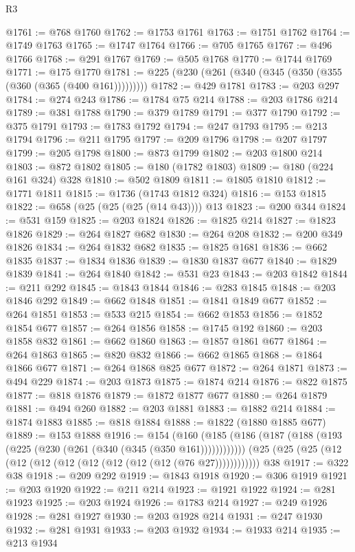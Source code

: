 \begin{lexlean}{R3}
\begin{coremodule}
@1761 := @768 @1760
@1762 := @1753 @1761
@1763 := @1751 @1762
@1764 := @1749 @1763
@1765 := @1747 @1764
@1766 := @705 @1765
@1767 := @496 @1766
@1768 := @291 @1767
@1769 := @505 @1768
@1770 := @1744 @1769
@1771 := @175 @1770
@1781 := @225 (@230 (@261 (@340 (@345 (@350 (@355 (@360 (@365 (@400 @161)))))))))
@1782 := @429 @1781
@1783 := @203 @297
@1784 := @274 @243
@1786 := @1784 @75 @214
@1788 := @203 @1786 @214
@1789 := @381 @1788
@1790 := @379 @1789
@1791 := @377 @1790
@1792 := @375 @1791
@1793 := @1783 @1792
@1794 := @247 @1793
@1795 := @213 @1794
@1796 := @211 @1795
@1797 := @209 @1796
@1798 := @207 @1797
@1799 := @205 @1798
@1800 := @873 @1799
@1802 := @203 @1800 @214
@1803 := @872 @1802
@1805 := @180 (@1782 @1803)
@1809 := @180 (@224 @161 @324) @328
@1810 := @502 @1809
@1811 := @1805 @1810
@1812 := @1771 @1811
@1815 := @1736 (@1743 @1812 @324)
@1816 := @153 @1815
@1822 := @658 (@25 (@25 (@25 (@14 @43)))) @13
@1823 := @200 @344
@1824 := @531 @159
@1825 := @203 @1824
@1826 := @1825 @214
@1827 := @1823 @1826
@1829 := @264 @1827 @682
@1830 := @264 @208
@1832 := @200 @349 @1826
@1834 := @264 @1832 @682
@1835 := @1825 @1681
@1836 := @662 @1835
@1837 := @1834 @1836
@1839 := @1830 @1837 @677
@1840 := @1829 @1839
@1841 := @264 @1840
@1842 := @531 @23
@1843 := @203 @1842
@1844 := @211 @292
@1845 := @1843 @1844
@1846 := @283 @1845
@1848 := @203 @1846 @292
@1849 := @662 @1848
@1851 := @1841 @1849 @677
@1852 := @264 @1851
@1853 := @533 @215
@1854 := @662 @1853
@1856 := @1852 @1854 @677
@1857 := @264 @1856
@1858 := @1745 @192
@1860 := @203 @1858 @832
@1861 := @662 @1860
@1863 := @1857 @1861 @677
@1864 := @264 @1863
@1865 := @820 @832
@1866 := @662 @1865
@1868 := @1864 @1866 @677
@1871 := @264 @1868 @825 @677
@1872 := @264 @1871
@1873 := @494 @229
@1874 := @203 @1873
@1875 := @1874 @214
@1876 := @822 @1875
@1877 := @818 @1876
@1879 := @1872 @1877 @677
@1880 := @264 @1879
@1881 := @494 @260
@1882 := @203 @1881
@1883 := @1882 @214
@1884 := @1874 @1883
@1885 := @818 @1884
@1888 := @1822 (@1880 @1885 @677)
@1889 := @153 @1888
@1916 := @154
    (@160 (@185 (@186 (@187 (@188 (@193 (@225 (@230 (@261 (@340 (@345 (@350 @161))))))))))))
    (@25 (@25 (@25 (@12 (@12 (@12 (@12 (@12 (@12 (@12 (@12 (@76 @27))))))))))))
    @38
@1917 := @322 @38
@1918 := @209 @292
@1919 := @1843 @1918
@1920 := @306 @1919
@1921 := @203 @1920
@1922 := @211 @214
@1923 := @1921 @1922
@1924 := @281 @1923
@1925 := @203 @1924
@1926 := @1783 @214
@1927 := @249 @1926
@1928 := @281 @1927
@1930 := @203 @1928 @214
@1931 := @247 @1930
@1932 := @281 @1931
@1933 := @203 @1932
@1934 := @1933 @214
@1935 := @213 @1934

\end{coremodule}
\end{lexlean}
